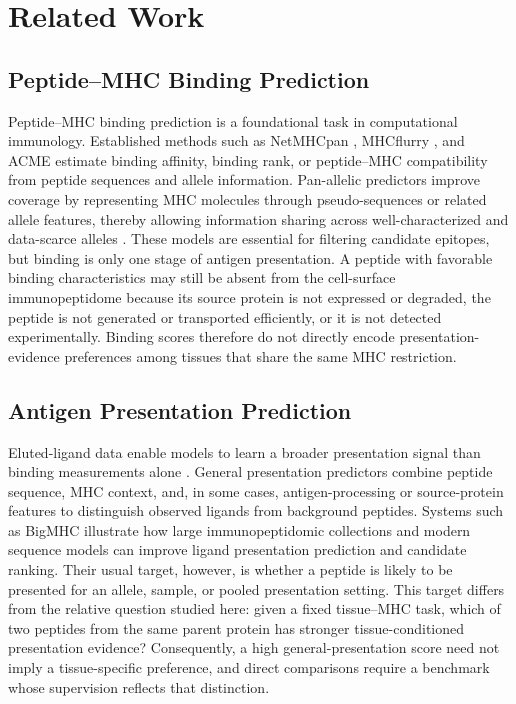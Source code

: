 \section{Related Work}

\subsection{Peptide--MHC Binding Prediction}

Peptide--MHC binding prediction is a foundational task in computational immunology. Established methods such as NetMHCpan \cite{reynisson2020netmhcpan}, MHCflurry \cite{odonnell2020mhcflurry}, and ACME \cite{hu2019acme} estimate binding affinity, binding rank, or peptide--MHC compatibility from peptide sequences and allele information. Pan-allelic predictors improve coverage by representing MHC molecules through pseudo-sequences or related allele features, thereby allowing information sharing across well-characterized and data-scarce alleles \cite{nielsen2007netmhcpan,reynisson2020netmhcpan}. These models are essential for filtering candidate epitopes, but binding is only one stage of antigen presentation. A peptide with favorable binding characteristics may still be absent from the cell-surface immunopeptidome because its source protein is not expressed or degraded, the peptide is not generated or transported efficiently, or it is not detected experimentally. Binding scores therefore do not directly encode presentation-evidence preferences among tissues that share the same MHC restriction.

\subsection{Antigen Presentation Prediction}

Eluted-ligand data enable models to learn a broader presentation signal than binding measurements alone \cite{reynisson2020netmhcpan,odonnell2020mhcflurry}. General presentation predictors combine peptide sequence, MHC context, and, in some cases, antigen-processing or source-protein features to distinguish observed ligands from background peptides. Systems such as BigMHC \cite{albert2023bigmhc} illustrate how large immunopeptidomic collections and modern sequence models can improve ligand presentation prediction and candidate ranking. Their usual target, however, is whether a peptide is likely to be presented for an allele, sample, or pooled presentation setting. This target differs from the relative question studied here: given a fixed tissue--MHC task, which of two peptides from the same parent protein has stronger tissue-conditioned presentation evidence? Consequently, a high general-presentation score need not imply a tissue-specific preference, and direct comparisons require a benchmark whose supervision reflects that distinction.

